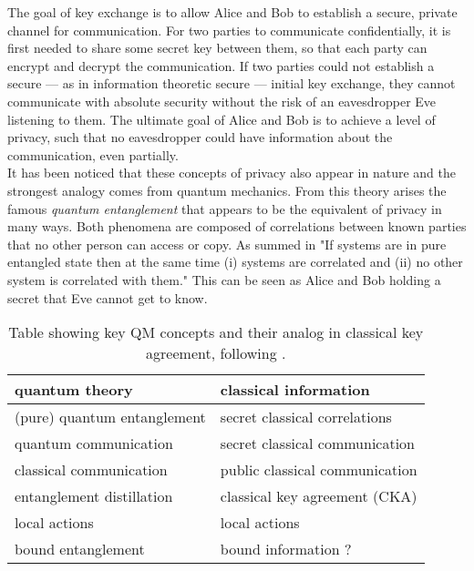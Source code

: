 

The goal of key exchange is to allow Alice and Bob to establish a secure, private channel for communication.
For two parties to communicate confidentially, it is first needed to share some secret key between them, so that each party can encrypt and decrypt the communication.
If two parties could not establish a secure --- as in information theoretic secure --- initial key exchange, they cannot communicate with absolute security without the risk of an eavesdropper Eve listening to them.
The ultimate goal of Alice and Bob is to achieve a level of privacy, such that no eavesdropper could have information about the communication, even partially.\\

It has been noticed that these concepts of privacy also appear in nature and the strongest analogy comes from quantum mechanics.\footnotemark 
From this theory arises the famous \emph{quantum entanglement} that appears to be the equivalent of privacy in many ways.
Both phenomena are composed of correlations between known parties that no other person can access or copy. As summed in \cite{4H07} "If systems are in pure entangled state then at the same time (i) systems are correlated and (ii) no other system is correlated with them."
This can be seen as Alice and Bob holding a secret that Eve cannot get to know.
\begin{table}[h]
	 \centering
	 	\begin{tabular}{ l | l}
	 		\textbf{quantum theory} & \textbf{classical information} \\ 
	 		\hline 
	 		(pure) quantum entanglement & secret classical correlations \\ 
	 		quantum communication & secret classical communication \\ 
	 		classical communication & public classical communication \\ 
	 		entanglement distillation & classical key agreement (CKA) \\ 
	 		local actions & local actions \\ 
	 		bound entanglement & bound information ? \\
	 	\end{tabular} 
	 	\caption{Table showing key QM concepts and their analog in classical key agreement, following \cite{CP02}.
	 	\label{Tab:analogy}}
	 \end{table}
\\

